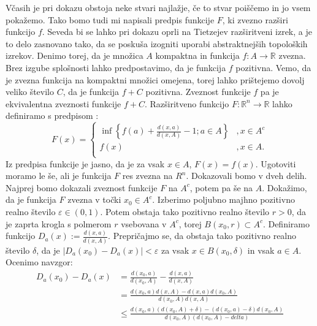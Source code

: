 \documentclass[mat1]{fmfdelo}
\newcommand{\R}{\mathbb R}
\newcommand{\0}{0}
\begin{document}
\begin{dokaz}
Včasih je pri dokazu obstoja neke stvari najlažje, če to stvar poiščemo in jo vsem pokažemo. Tako bomo tudi mi napisali predpis funkcije $F$, ki zvezno razširi funkcijo $f$. Seveda bi se lahko pri dokazu oprli na Tietzejev razširitveni izrek, a je to delo zasnovano tako, da se poskuša izogniti uporabi abstraktnejših topoloških izrekov. Denimo torej, da je množica $A$ kompaktna in funkcija \mbox{$f : A \to \R$} zvezna. Brez izgube splošnosti lahko predpostavimo, da je funkcija $f$ pozitivna. Vemo, da je zvezna funkcija na kompaktni množici omejena, torej lahko prištejemo dovolj veliko število $C$, da je funkcija $f + C$ pozitivna. Zveznost funkcije $f$ pa je ekvivalentna zveznosti funkcije $f + C$.
Razširitveno funkcijo \mbox{$F : \R^n \to \R$} lahko definiramo s predpisom :
\[  F(x) = \left \{
\begin{array}{ll}
	\inf \left \{ f(a) + \frac{d(x, a)}{d(x, A)} - 1; a \in A \right \} &, x \in A^c \\
	f(x) &, x \in A. \\
\end{array} 
\right. \]
Iz predpisa funkcije je jasno, da je za vsak $x \in A$, $F(x) = f(x)$. Ugotoviti moramo le še, ali je funkcija $F$ res zvezna na $R^n$.
Dokazovali bomo v dveh delih. Najprej bomo dokazali zveznost funkcije $F$ na $A^c$, potem pa še na $A$.
Dokažimo, da je funkcija $F$ zvezna v točki $x_0 \in A^c$. Izberimo poljubno majhno pozitivno realno število $\varepsilon \in (0, 1)$. Potem obstaja tako pozitivno realno število $r>0$, da je zaprta krogla s polmerom $r$ vsebovana v $A^c$, torej $B(x_0, r) \subset A^c$. Definiramo funkcijo $D_a(x) := \frac{d(x, a)}{d(x, A)}$. Prepričajmo se, da obstaja tako pozitivno realno število $\delta$, da je 
$|D_a(x_0) - D_a(x)| < \varepsilon$ za vsak $x \in B(x_0, \delta)$ in vsak $a \in A$.
Ocenimo navzgor:
\begin{equation*}
\begin{split}
D_a(x_0) - D_a(x) & = \frac{d(x_0, a)}{d(x_0, A)} - \frac{d(x, a)}{d(x, A)} \\
& =  \frac{d(x_0, a)d(x, A) - d(x, a)d(x_0, A)}{d(x_0, A) d(x, A)} \\
& \leq \frac{d(x_0, a)(d(x_0, A) + \delta) - (d(x_0, a) - \delta)d(x_0, A)}{d(x_0, A) (d(x_0, A) - delta)} \\

\end{split}
\end{equation*}
\end{dokaz}
\end{document}
